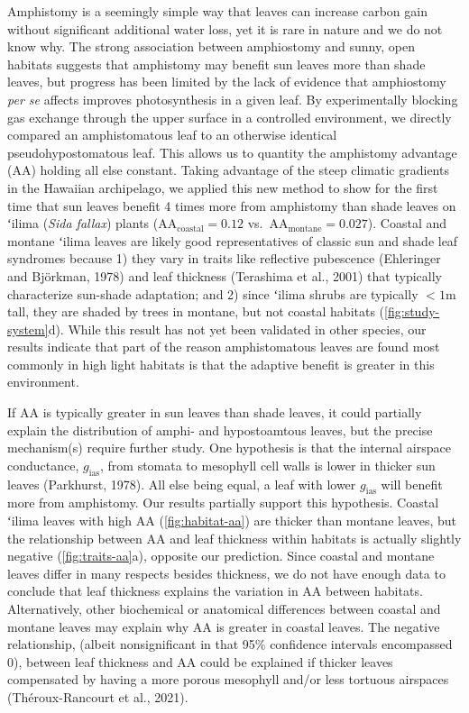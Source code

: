 \documentclass[
  letterpaper,
  DIV=11,
  numbers=noendperiod]{scrartcl}
\begin{document}
Amphistomy is a seemingly simple way that leaves can increase carbon
gain without significant additional water loss, yet it is rare in nature
and we do not know why. The strong association between amphiostomy and
sunny, open habitats suggests that amphistomy may benefit sun leaves
more than shade leaves, but progress has been limited by the lack of
evidence that amphiostomy \emph{per se} affects improves photosynthesis
in a given leaf. By experimentally blocking gas exchange through the
upper surface in a controlled environment, we directly compared an
amphistomatous leaf to an otherwise identical pseudohypostomatous leaf.
This allows us to quantity the amphistomy advantage (\(\mathrm{AA}\))
holding all else constant. Taking advantage of the steep climatic
gradients in the Hawaiian archipelago, we applied this new method to
show for the first time that sun leaves benefit 4 times more from
amphistomy than shade leaves on ʻilima (\emph{Sida fallax}) plants
(\(\mathrm{AA}_\text{coastal} = 0.12\)
vs.~\(\mathrm{AA}_\text{montane} = 0.027\)). Coastal and montane ʻilima
leaves are likely good representatives of classic sun and shade leaf
syndromes because 1) they vary in traits like reflective pubescence
(Ehleringer and Björkman, 1978) and leaf thickness (Terashima et al.,
2001) that typically characterize sun-shade adaptation; and 2) since
ʻilima shrubs are typically \(<1\)m tall, they are shaded by trees in
montane, but not coastal habitats (\autoref{fig:study-system}d). While
this result has not yet been validated in other species, our results
indicate that part of the reason amphistomatous leaves are found most
commonly in high light habitats is that the adaptive benefit is greater
in this environment.

If \(\mathrm{AA}\) is typically greater in sun leaves than shade leaves,
it could partially explain the distribution of amphi- and hypostoamtous
leaves, but the precise mechanism(s) require further study. One
hypothesis is that the internal airspace conductance,
\(g_\mathrm{ias}\), from stomata to mesophyll cell walls is lower in
thicker sun leaves (Parkhurst, 1978). All else being equal, a leaf with
lower \(g_\mathrm{ias}\) will benefit more from amphistomy. Our results
partially support this hypothesis. Coastal ʻilima leaves with high
\(\mathrm{AA}\) (\autoref{fig:habitat-aa}) are thicker than montane
leaves, but the relationship between \(\mathrm{AA}\) and leaf thickness
within habitats is actually slightly negative
(\autoref{fig:traits-aa}a), opposite our prediction. Since coastal and
montane leaves differ in many respects besides thickness, we do not have
enough data to conclude that leaf thickness explains the variation in
\(\mathrm{AA}\) between habitats. Alternatively, other biochemical or
anatomical differences between coastal and montane leaves may explain
why \(\mathrm{AA}\) is greater in coastal leaves. The negative
relationship, (albeit nonsignificant in that 95\% confidence intervals
encompassed 0), between leaf thickness and \(\mathrm{AA}\) could be
explained if thicker leaves compensated by having a more porous
mesophyll and/or less tortuous airspaces (Théroux-Rancourt et al.,
2021).
\end{document}
